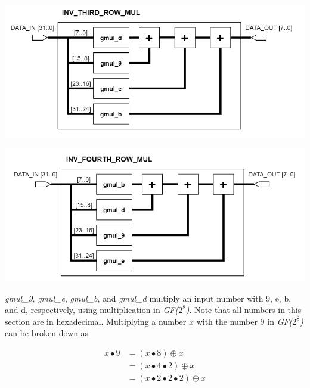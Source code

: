 \documentclass[a4paper, 10pt]{article}
\newenvironment{Figure}
    {\par\medskip\noindent\minipage{\linewidth}}
    {\endminipage\par\medskip}
\begin{document}
\begin{multicols}{2}
	\noindent
            \begin{Figure}
                \centering
                \includegraphics[width=\linewidth]{InvMixColumns-Inv_Third_Row_Mul.png}
                \label{fig:invthirdrowmul}
            \end{Figure}

	\noindent
            \begin{Figure}
                \centering
                \includegraphics[width=\linewidth]{InvMixColumns-Inv_Fourth_Row_Mul.png}
                \label{fig:invfourthrowmul}
            \end{Figure}

	\textit{gmul\_9}, \textit{gmul\_e}, \textit{gmul\_b}, and \textit{gmul\_d} multiply an input number with 9, e, b, and d, respectively, using multiplication in \textit{GF($2^{8}$)}. Note that all numbers in this section are in hexadecimal. Multiplying a number $x$ with the number 9 in \textit{GF($2^{8}$)} can be broken down as 

\begin{equation}
\begin{aligned}
	x \bullet 9 &= \left(x \bullet 8\right) \oplus x \\
	&= \left(x \bullet 4 \bullet 2\right) \oplus x \\
	&= \left(x \bullet 2 \bullet 2 \bullet 2\right) \oplus x
\end{aligned}
\end{equation}


\end{multicols}
\end{document}
